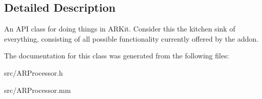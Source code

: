 \subsection{Detailed Description}
An A\+PI class for doing things in A\+R\+Kit. Consider this the kitchen sink of everything, consisting of all possible functionality currently offered by the addon. 

The documentation for this class was generated from the following files\+:\begin{DoxyCompactItemize}
\item 
src/A\+R\+Processor.\+h\item 
src/A\+R\+Processor.\+mm\end{DoxyCompactItemize}
